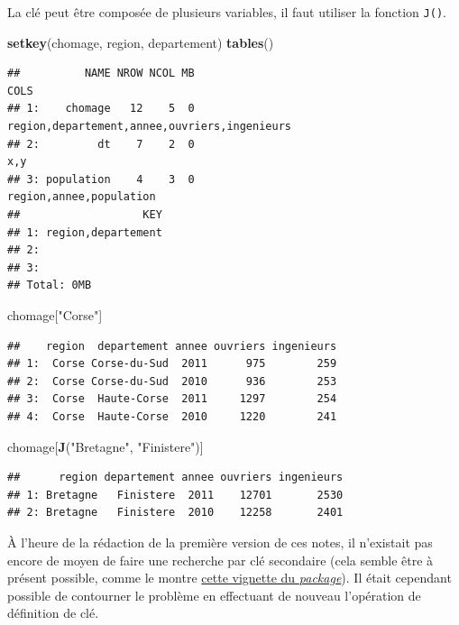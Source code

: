 \documentclass[
  11pt,
]{book}
\newenvironment{Shaded}{\begin{snugshade}}{\end{snugshade}}
\newcommand{\KeywordTok}[1]{\textcolor[rgb]{0.13,0.29,0.53}{\textbf{#1}}}
\newcommand{\NormalTok}[1]{#1}
\newcommand{\StringTok}[1]{\textcolor[rgb]{0.31,0.60,0.02}{#1}}
\numberwithin{equation}{section}
\numberwithin{countremarque}{section}
\begin{document}
La clé peut être composée de plusieurs variables, il faut utiliser la fonction \texttt{J()}.

\begin{Shaded}
\begin{Highlighting}[]
\KeywordTok{setkey}\NormalTok{(chomage, region, departement)}
\KeywordTok{tables}\NormalTok{()}
\end{Highlighting}
\end{Shaded}

\begin{lstlisting}
##          NAME NROW NCOL MB                                         COLS
## 1:    chomage   12    5  0 region,departement,annee,ouvriers,ingenieurs
## 2:         dt    7    2  0                                          x,y
## 3: population    4    3  0                      region,annee,population
##                   KEY
## 1: region,departement
## 2:                   
## 3:                   
## Total: 0MB
\end{lstlisting}

\begin{Shaded}
\begin{Highlighting}[]
\NormalTok{chomage[}\StringTok{"Corse"}\NormalTok{]}
\end{Highlighting}
\end{Shaded}

\begin{lstlisting}
##    region  departement annee ouvriers ingenieurs
## 1:  Corse Corse-du-Sud  2011      975        259
## 2:  Corse Corse-du-Sud  2010      936        253
## 3:  Corse  Haute-Corse  2011     1297        254
## 4:  Corse  Haute-Corse  2010     1220        241
\end{lstlisting}

\begin{Shaded}
\begin{Highlighting}[]
\NormalTok{chomage[}\KeywordTok{J}\NormalTok{(}\StringTok{"Bretagne"}\NormalTok{, }\StringTok{"Finistere"}\NormalTok{)]}
\end{Highlighting}
\end{Shaded}

\begin{lstlisting}
##      region departement annee ouvriers ingenieurs
## 1: Bretagne   Finistere  2011    12701       2530
## 2: Bretagne   Finistere  2010    12258       2401
\end{lstlisting}

À l'heure de la rédaction de la première version de ces notes, il n'existait pas encore de moyen de faire une recherche par clé secondaire (cela semble être à présent possible, comme le montre \href{https://cran.r-project.org/web/packages/data.table/vignettes/datatable-secondary-indices-and-auto-indexing.html}{cette vignette du \emph{package}}). Il était cependant possible de contourner le problème en effectuant de nouveau l'opération de définition de clé.
\end{document}
